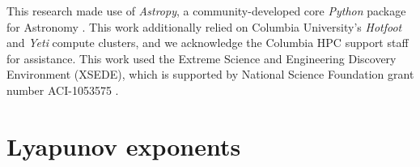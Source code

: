 \documentclass[letterpaper,12pt,preprint]{aastex}
\newcommand{\ident}{\mathbb{1}}
\newcommand{\project}[1]{\textsl{#1}}
\begin{document}
This research made use of \project{Astropy}, a community-developed core \project{Python} package for Astronomy \citep{astropy13}. This work additionally relied on Columbia University's \emph{Hotfoot} and \emph{Yeti} compute clusters, and we acknowledge the Columbia HPC support staff for assistance. This work used the Extreme Science and Engineering Discovery Environment (XSEDE), which is supported by National Science Foundation grant number ACI-1053575 \citep{xsede}.




\appendix
\section{Lyapunov exponents} \label{sec:lyapapdx}

\end{document}
